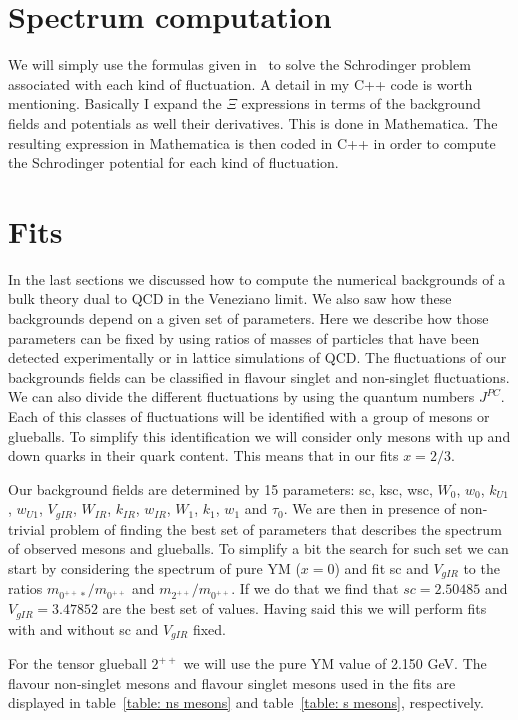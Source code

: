 \documentclass[10 pt]{article}
\begin{document}
\section{Spectrum computation}
We will simply use the formulas given in~\cite{Arean:2013tja} to solve the Schrodinger problem associated with each kind of fluctuation. A detail in my C++ code is worth mentioning. Basically I expand the $\Xi$ expressions in terms of the background fields and potentials as well their derivatives. This is done in Mathematica. The resulting expression in Mathematica is then coded in C++ in order to compute the Schrodinger potential for each kind of fluctuation.



\section{Fits}

In the last sections we discussed how to compute the numerical backgrounds of a bulk theory dual to QCD in the Veneziano limit. We also saw how these backgrounds depend on a given set of parameters. Here we describe how those parameters can be fixed by using ratios of masses of particles that have been detected experimentally or in lattice simulations of QCD. The fluctuations of our backgrounds fields can be classified in flavour singlet and non-singlet fluctuations. We can also divide the different  fluctuations by using the quantum numbers $J^{PC}$.  Each of this classes of fluctuations will be identified with a group of mesons or glueballs. To simplify this identification we will consider only mesons with up and down quarks in their quark content. This means that in our fits $x = 2 / 3$.

Our background fields are determined by 15 parameters: sc, ksc, wsc, $W_0$, $w_0$, $k_{U1}$, $w_{U1}$, $V_{gIR}$, $W_{IR}$, $k_{IR}$, $w_{IR}$, $W_1$, $k_1$, $w_1$ and $\tau_0$. We are then in presence of non-trivial problem of finding the best set of parameters that describes the spectrum of observed mesons and glueballs. To simplify a bit the search for such set we can start by considering the spectrum of pure YM ($x = 0$) and fit sc and $V_{gIR}$ to the ratios $m_{0^{++}*} / m_{0^{++}}$ and $m_{2^{++}}/m_{0^{++}}$. If we do that we find that $sc = 2.50485$ and $V_{gIR} = 3.47852$ are the best set of values. Having said this we will perform fits with and without sc and $V_{gIR}$ fixed.

For the tensor glueball $2^{++}$ we will use the pure YM value of 2.150 GeV. The flavour non-singlet mesons and flavour singlet mesons used in the fits are displayed in table~\ref{table: ns mesons} and table~\ref{table: s mesons}, respectively.
\end{document}
